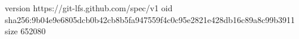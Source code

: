 version https://git-lfs.github.com/spec/v1
oid sha256:9b04e9e6805dcb0b42cb8b5fa947559f4c0c95e2821e428db16c89a8c99b3911
size 652080
